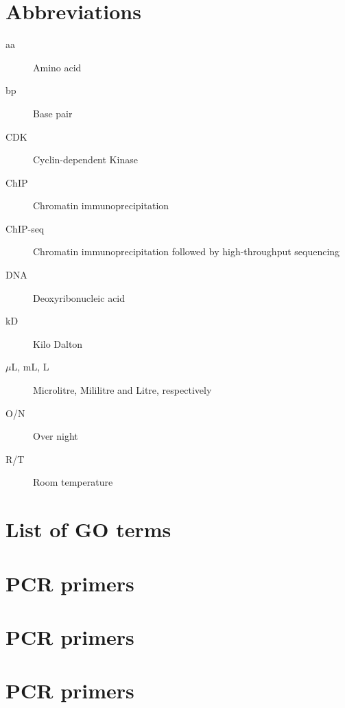 \documentclass[11pt,twoside,a4paper]{report}
\begin{document}
\cleardoublepage
\begin{appendices}
	\chapter{Abbreviations}
		\begin{description}
			\item[aa] Amino acid
			\item[bp] Base pair
			\item[CDK] Cyclin-dependent Kinase
			\item[ChIP] Chromatin immunoprecipitation
			\item[ChIP-seq] Chromatin immunoprecipitation followed by high-throughput sequencing
			\item[DNA] Deoxyribonucleic acid
			\item[kD] Kilo Dalton
			\item[$\mu$L, mL, L] Microlitre, Mililitre and Litre, respectively
			\item[O/N] Over night
			\item[R/T] Room temperature
		\end{description}

	\chapter{List of GO terms}
	\chapter{PCR primers}
	\chapter{PCR primers}
	\chapter{PCR primers}
\end{appendices}
\end{document}
